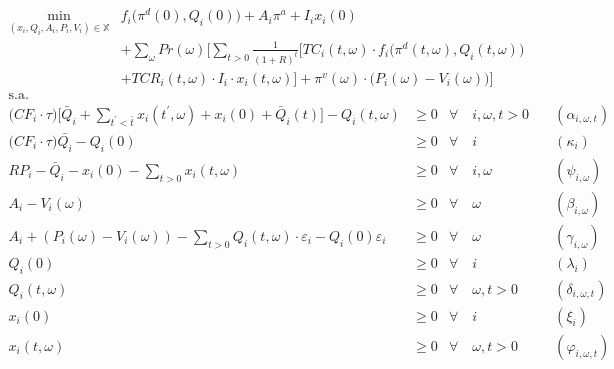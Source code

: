 \begin{align}
\min_{(x_i,Q_i,A_i,P_i,V_i)\in \mathbb{X}} & f_i \big( \pi^d(0),Q_i(0)\big)+ A_i \pi^{a} + I_i x_i(0) \nonumber \\ 
& + \sum_{\omega} Pr(\omega)   \Bigg[ \sum_{t>0} \frac{1}{(1+R)^t} \Big[ TC_i(t,\omega)\cdot f_i \big( \pi^d(t,\omega),Q_i(t,\omega) \big) \nonumber \\
& + TCR_i(t,\omega) \cdot I_i\cdot x_i(t,\omega) \Big] + \pi^v(\omega)\cdot \big(P_i(\omega)-V_i(\omega)\big) \Bigg] \label{fo:prod} \\
\textrm{s.a. \ } \nonumber
\end{align}
\begin{align}
\Big(CF_i \cdot\tau\Big)  \Bigg[\bar{Q}_i + \sum_{t^{\prime}<\bar{t}} x_i(t^\prime,\omega) + x_i(0)+ \bar{Q}_i(t) \Bigg] - Q_i(t,\omega) & \geq 0  & \forall  \quad i,\omega, t  > 0 & \quad (\alpha_{i,\omega,t})\label{res:1} \\
\Big(CF_i\cdot\tau \Big)\bar{Q_i}-Q_{i}(0) & \geq 0  & \forall  \quad i & \quad (\kappa_i) \label{res:2} \\
RP_i - \bar{Q}_i  - x_i(0) - \sum_{t > 0} x_i(t,\omega) & \geq 0 &  \forall \quad i,\omega &   \quad (\psi_{i,\omega}) \label{res:3} \\
A_{i} -V_i(\omega) & \geq  0  & \forall  \quad \omega & \quad (\beta_{i,\omega}) \label{res:4} \\
A_{i} + (P_i(\omega) - V_i(\omega))-\sum_{t>0}Q_i(t, \omega)\cdot \varepsilon_{i}-Q_i(0)\varepsilon_{i} & \geq  0  &\forall \quad \omega & \quad (\gamma_{i,\omega})\label{res:5} \\
Q_i(0) & \geq  0 & \forall \quad i & \quad (\lambda_i) \label{res:q0} \\ 
Q_i(t, \omega) & \geq  0   & \forall \quad \omega, t >0 & \quad (\delta_{i,\omega,t})\label{res:qt} \\
x_i(0) & \geq  0 & \forall  \quad i & \quad (\xi_i)  \label{res:capi0} \\ 
x_i(t, \omega) & \geq  0   & \forall  \quad \omega, t >0 & \quad (\varphi_{i,\omega,t})\label{res:capt}
\end{align}


